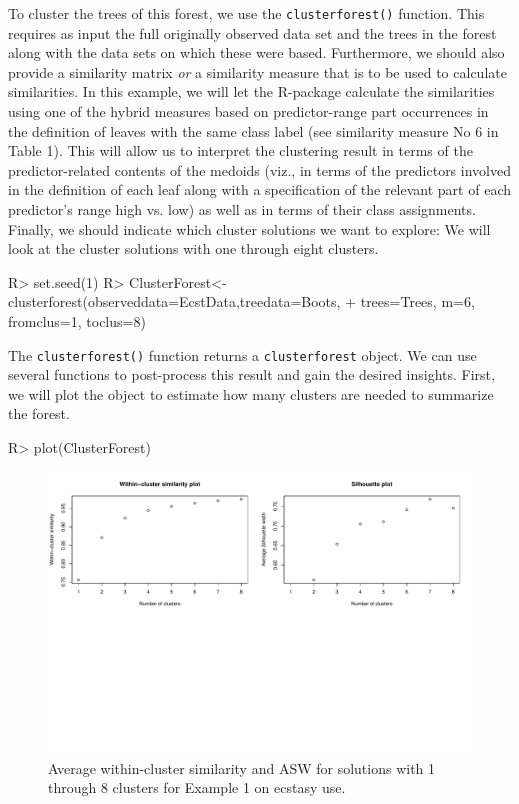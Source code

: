 To cluster the trees of this forest, we use the \texttt{clusterforest()} function. This requires as input the full originally observed data set and the trees in the forest along with the data sets on which these were based. Furthermore, we should also provide a similarity matrix \textit{or} a similarity measure that is to be used to calculate similarities. In this example, we will let the R-package calculate the similarities using one of the hybrid measures based on predictor-range part occurrences in the definition of leaves with the same class label (see similarity measure No 6 in Table 1). This will allow us to interpret the clustering result in terms of the predictor-related contents of the medoids (viz., in terms of the predictors involved in the definition of each leaf along with a specification of the relevant part of each predictor's range high vs. low) as well as in terms of their class assignments. Finally, we should indicate which cluster solutions we want to explore: We will look at the cluster solutions with one through eight clusters.
\begin{example}

R> set.seed(1)
R> ClusterForest<- clusterforest(observeddata=EcstData,treedata=Boots,
+   trees=Trees, m=6, fromclus=1, toclus=8)
\end{example}

The \texttt{clusterforest()} function returns a \texttt{clusterforest} object. We can use several functions to post-process this result and gain the desired insights. First, we will plot the object to estimate how many clusters are needed to summarize the forest.
\begin{example}
R> plot(ClusterForest)
\end{example}
\begin{figure}[H]
	\centering
	\includegraphics[width=\linewidth, trim= 0 300 20 0, clip]{articleV3-clusters}
	\caption{Average within-cluster similarity and ASW for solutions with 1 through 8 clusters for Example 1 on ecstasy use.}
\label{fig:Ex1Measures}	
\end{figure}

